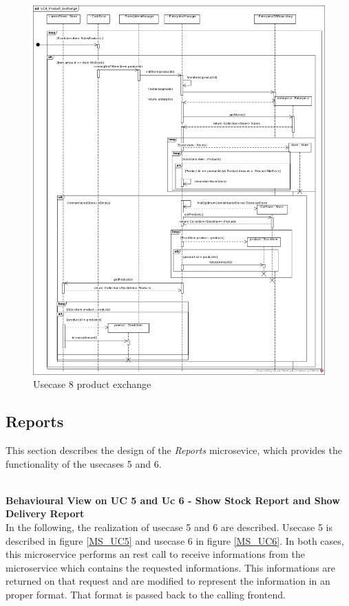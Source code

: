			\begin{figure}[!h]
				\centering
				\includegraphics[width = 1\textwidth]{img/UC8_Product_Exchange.jpg}
				\caption{Usecase 8 product exchange}
				\label{MS_UC8}
			\end{figure}
		\FloatBarrier	
		
		\subsection{Reports}
		This section describes the design of the \textit{Reports} microsevice, which provides the functionality of the usecases 5 and 6.
		
		 \noindent
		 \\
		\textbf{Behavioural View on UC 5 and Uc 6 - Show Stock Report and Show Delivery Report} \\
		In the following, the realization of usecase 5 and 6 are described. Usecase 5 is described in figure \ref{MS_UC5} and usecase 6 in figure \ref{MS_UC6}. 
		In both cases, this microservice performs an rest call to receive informations from the microservice which contains the requested informations. This informations are returned on that request and are modified to represent the information in an proper format. That format is passed back to the calling frontend.
			
